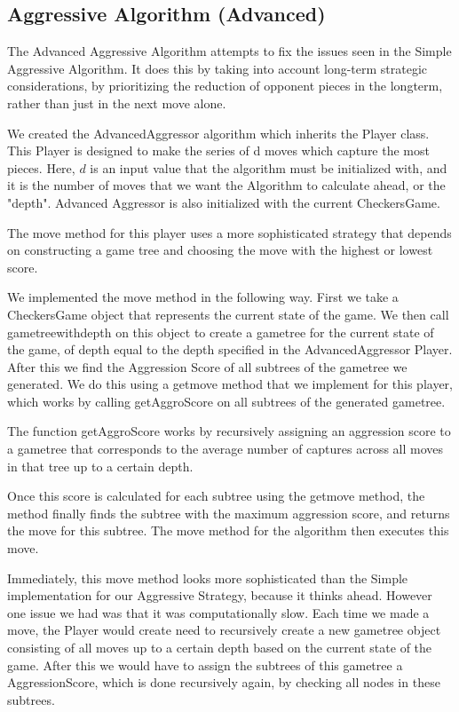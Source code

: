 \documentclass[fontsize=11pt]{article}
\begin{document}
\subsection*{Aggressive Algorithm (Advanced)}
The Advanced Aggressive Algorithm attempts to fix the issues seen in the Simple Aggressive Algorithm. It does this by taking into account long-term strategic considerations, by prioritizing the reduction of opponent pieces in the longterm, rather than just in the next move alone. 

We created the AdvancedAggressor algorithm which inherits the Player class. This Player is designed to make the series of d moves which capture the most pieces. Here, $d$ is an input value that the algorithm must be initialized with, and it is the number of moves that we want the Algorithm to calculate ahead, or the "depth". Advanced Aggressor is also initialized with the current CheckersGame.

The move method for this player uses a more sophisticated strategy that depends on constructing a game tree and choosing the move with the highest or lowest score.

We implemented the move method in the following way. First we take a CheckersGame object that represents the current state of the game. We then call gametreewithdepth on this object to create a gametree for the current state of the game, of depth equal to the depth specified in the AdvancedAggressor Player. After this we find the Aggression Score of all subtrees of the gametree we generated. We do this using a getmove method that we implement for this player, which works by calling getAggroScore on all subtrees of the generated gametree. 

The function getAggroScore works by recursively assigning an aggression score to a gametree that corresponds to the average number of captures across all moves in that tree up to a certain depth. 

Once this score is calculated for each subtree using the getmove method, the method finally finds the subtree with the maximum aggression score, and returns the move for this subtree. The move method for the algorithm then executes this move.

Immediately, this move method looks more sophisticated than the Simple implementation for our Aggressive Strategy, because it thinks ahead. However one issue we had was that it was computationally slow. Each time we made a move, the Player would create need to recursively create a new gametree object consisting of all moves up to a certain depth based on the current state of the game. After this we would have to assign the subtrees of this gametree a AggressionScore, which is done recursively again, by checking all nodes in these subtrees.
\end{document}
